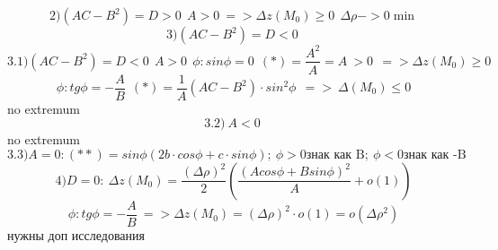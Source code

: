 \documentclass{article}
\begin{document}
\begin{equation*}
    2) (AC-B^2)=D>0\ \ A>0\ => \Delta z(M_0)\geq 0 \ \ \Delta \rho -> 0 \min
\end{equation*}
\begin{equation*}
    3) (AC-B^2)=D<0\ 
\end{equation*}
\begin{equation*}
    3.1) (AC-B^2)=D<0\ \ A>0\ \ \phi: sin\phi = 0\ \ (*)=\frac{A^2}{A} = A \ >0\ \ => \Delta z(M_0)\geq 0
\end{equation*}
\begin{equation*}
    \phi: tg\phi = -\frac{A}{B}\ \ (*)=\frac{1}{A}(AC - B^2)\cdot sin^2\phi\ \ => \ \Delta(M_0)\leq 0 
\end{equation*}
no extremum
\begin{equation*}
    3.2) \ A<0\:
\end{equation*}
no extremum
\begin{equation*}
    3.3) A=0: (**)= sin \phi(2b\cdot cos\phi+c\cdot sin\phi);\ \phi > 0 \text{знак как B};\ \phi < 0 \text{знак как -B}
\end{equation*}
\begin{equation*}
    4) D=0:\ \Delta z(M_0)=\frac{(\Delta \rho)^2}{2}(\frac{(Acos\phi + Bsin\phi)^2}{A}+o(1))
\end{equation*}
\begin{equation*}
    \phi: tg\phi = - \frac{A}{B}\ => \Delta z (M_0) = (\Delta\rho)^2\cdot o(1) = o(\Delta\rho^2)
\end{equation*}
нужны доп исследования
\end{document}
